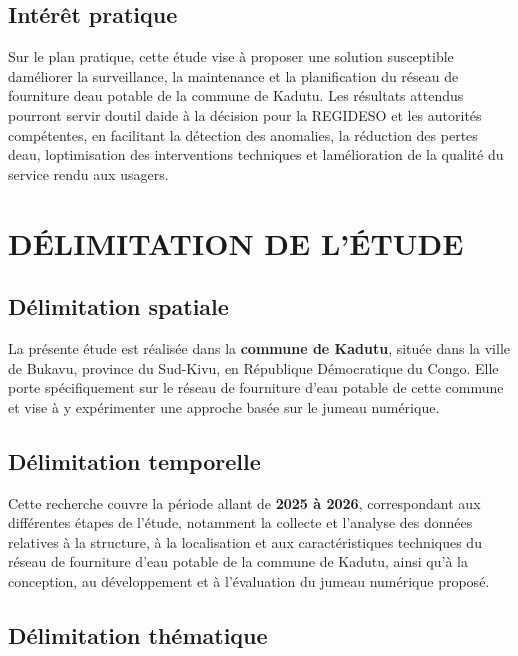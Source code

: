 \subsection{Intérêt pratique}\label{intuxe9ruxeat-pratique}

Sur le plan pratique, cette étude vise à proposer une solution
susceptible d\textquotesingle améliorer la surveillance, la maintenance
et la planification du réseau de fourniture d\textquotesingle eau
potable de la commune de Kadutu. Les résultats attendus pourront servir
d\textquotesingle outil d\textquotesingle aide à la décision pour la
REGIDESO et les autorités compétentes, en facilitant la détection des
anomalies, la réduction des pertes d\textquotesingle eau,
l\textquotesingle optimisation des interventions techniques et
l\textquotesingle amélioration de la qualité du service rendu aux
usagers.

\section{DÉLIMITATION DE L'ÉTUDE}
\label{delimitation-de-letude}

\subsection{Délimitation spatiale}
\label{delimitation-spatiale}

La présente étude est réalisée dans la \textbf{commune de Kadutu},
située dans la ville de Bukavu, province du Sud-Kivu, en République
Démocratique du Congo. Elle porte spécifiquement sur le réseau de
fourniture d'eau potable de cette commune et vise à y expérimenter une
approche basée sur le jumeau numérique.

\subsection{Délimitation temporelle}
\label{delimitation-temporelle}

Cette recherche couvre la période allant de \textbf{2025 à 2026},
correspondant aux différentes étapes de l'étude, notamment la collecte
et l'analyse des données relatives à la structure, à la localisation et
aux caractéristiques techniques du réseau de fourniture d'eau potable
de la commune de Kadutu, ainsi qu'à la conception, au développement et à
l'évaluation du jumeau numérique proposé.

\subsection{Délimitation thématique}
\label{delimitation-thematique}

